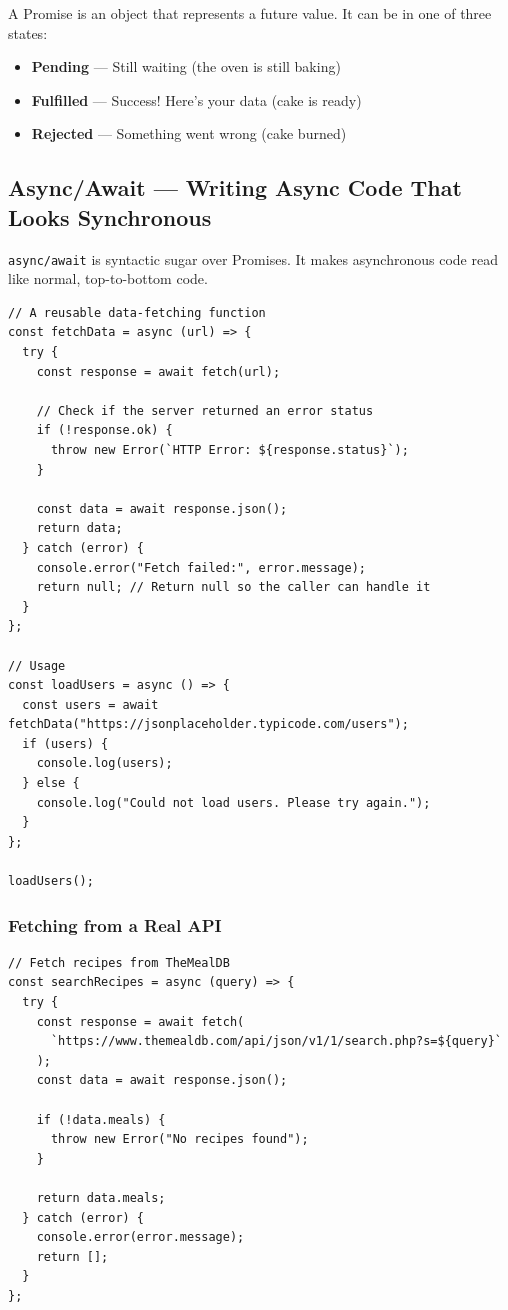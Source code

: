 \documentclass[12pt]{article}
\begin{document}
A Promise is an object that represents a future value. It can be in one of three states:
\begin{itemize}[noitemsep]
    \item \textbf{Pending} --- Still waiting (the oven is still baking)
    \item \textbf{Fulfilled} --- Success! Here's your data (cake is ready)
    \item \textbf{Rejected} --- Something went wrong (cake burned)
\end{itemize}

\subsection{Async/Await --- Writing Async Code That Looks Synchronous}

\texttt{async/await} is syntactic sugar over Promises. It makes asynchronous code read like normal, top-to-bottom code.

\begin{proway}
\begin{lstlisting}
// A reusable data-fetching function
const fetchData = async (url) => {
  try {
    const response = await fetch(url);

    // Check if the server returned an error status
    if (!response.ok) {
      throw new Error(`HTTP Error: ${response.status}`);
    }

    const data = await response.json();
    return data;
  } catch (error) {
    console.error("Fetch failed:", error.message);
    return null; // Return null so the caller can handle it
  }
};

// Usage
const loadUsers = async () => {
  const users = await fetchData("https://jsonplaceholder.typicode.com/users");
  if (users) {
    console.log(users);
  } else {
    console.log("Could not load users. Please try again.");
  }
};

loadUsers();
\end{lstlisting}
\end{proway}

\subsubsection*{Fetching from a Real API}

\begin{lstlisting}
// Fetch recipes from TheMealDB
const searchRecipes = async (query) => {
  try {
    const response = await fetch(
      `https://www.themealdb.com/api/json/v1/1/search.php?s=${query}`
    );
    const data = await response.json();

    if (!data.meals) {
      throw new Error("No recipes found");
    }

    return data.meals;
  } catch (error) {
    console.error(error.message);
    return [];
  }
};
\end{lstlisting}
\end{document}
